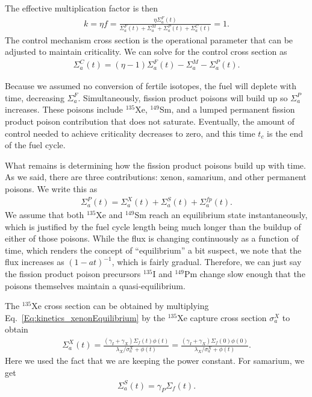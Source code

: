The effective multiplication factor is then
\begin{align}
  k = \eta f = \frac{ \eta \Sigma_a^F(t) }{ \Sigma_a^F(t) + \Sigma_a^M + \Sigma_a^P(t) + \Sigma_a^C(t) } = 1.
\end{align}
The control mechanism cross section is the operational parameter that can be adjusted to maintain criticality. We can solve for the control cross section as
\begin{align}
  \Sigma_a^C(t) = ( \eta - 1 ) \Sigma_a^F(t) - \Sigma_a^M - \Sigma_a^P(t) . \label{Eq:kinetics_simplifiedBurnup_controlXS}
\end{align}

Because we assumed no conversion of fertile isotopes, the fuel will deplete with time, decreasing $\Sigma_a^F$. Simultaneously, fission product poisons will build up so $\Sigma_a^P$ increases. These poisons include $^{135}$Xe, $^{149}$Sm, and a lumped permanent fission product poison contribution that does not saturate. Eventually, the amount of control needed to achieve criticality decreases to zero, and this time $t_c$ is the end of the fuel cycle.

What remains is determining how the fission product poisons build up with time. As we said, there are three contributions: xenon, samarium, and other permanent poisons. We write this as
\begin{align}
  \Sigma_a^P(t) = \Sigma_a^X(t) + \Sigma_a^S(t) + \Sigma_a^{fp}(t) .
\end{align}
We assume that both $^{135}$Xe and $^{149}$Sm reach an equilibrium state instantaneously, which is justified by the fuel cycle length being much longer than the buildup of either of those poisons. While the flux is changing continuously as a function of time, which renders the concept of ``equilibrium'' a bit suspect, we note that the flux increases as $(1-at)^{-1}$, which is fairly gradual. Therefore, we can just say the fission product poison precursors $^{135}$I and $^{149}$Pm change slow enough that the poisons themselves maintain a quasi-equilibrium.

The $^{135}$Xe cross section can be obtained by multiplying Eq.~\eqref{Eq:kinetics_xenonEquilibrium} by the $^{135}$Xe capture cross section $\sigma_a^X$ to obtain
\begin{align}
  \Sigma_a^X(t) = \frac{ ( \gamma_I + \gamma_X ) \Sigma_f(t) \phi(t) }{ \lambda_X / \sigma_a^X + \phi(t) } = \frac{ ( \gamma_I + \gamma_X ) \Sigma_f(0) \phi(0) }{ \lambda_X / \sigma_a^X + \phi(t) } .
\end{align}
Here we used the fact that we are keeping the power constant. For samarium, we get
\begin{align}
  \Sigma_a^S(t) = \gamma_P \Sigma_f(t) .
\end{align}

